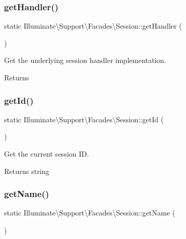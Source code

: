 \subsubsection{\texorpdfstring{get\+Handler()}{getHandler()}}
{\footnotesize\ttfamily static Illuminate\textbackslash{}\+Support\textbackslash{}\+Facades\textbackslash{}\+Session\+::get\+Handler (\begin{DoxyParamCaption}{ }\end{DoxyParamCaption})\hspace{0.3cm}{\ttfamily [static]}}

Get the underlying session handler implementation.

\begin{DoxyReturn}{Returns}

\end{DoxyReturn}
\mbox{\label{class_illuminate_1_1_support_1_1_facades_1_1_session_adcd14ba99ec3702160ee898edf08abf6}} 
\subsubsection{\texorpdfstring{get\+Id()}{getId()}}
{\footnotesize\ttfamily static Illuminate\textbackslash{}\+Support\textbackslash{}\+Facades\textbackslash{}\+Session\+::get\+Id (\begin{DoxyParamCaption}{ }\end{DoxyParamCaption})\hspace{0.3cm}{\ttfamily [static]}}

Get the current session ID.

\begin{DoxyReturn}{Returns}
string 
\end{DoxyReturn}
\mbox{\label{class_illuminate_1_1_support_1_1_facades_1_1_session_a6b79f32fe74f5d416c0b00c0349507e2}} 
\subsubsection{\texorpdfstring{get\+Name()}{getName()}}
{\footnotesize\ttfamily static Illuminate\textbackslash{}\+Support\textbackslash{}\+Facades\textbackslash{}\+Session\+::get\+Name (\begin{DoxyParamCaption}{ }\end{DoxyParamCaption})\hspace{0.3cm}{\ttfamily [static]}}

